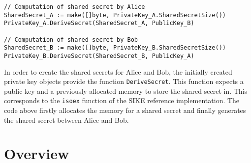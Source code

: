 \begin{lstlisting}[]
// Computation of shared secret by Alice
SharedSecret_A := make([]byte, PrivateKey_A.SharedSecretSize())
PrivateKey_A.DeriveSecret(SharedSecret_A, PublicKey_B)

// Computation of shared secret by Bob
SharedSecret_B := make([]byte, PrivateKey_B.SharedSecretSize())
PrivateKey_B.DeriveSecret(SharedSecret_B, PublicKey_A)
\end{lstlisting}
In order to create the shared secrets for Alice and Bob, the initially created private key objects provide the function \texttt{DeriveSecret}. This function expects a public key and a previously allocated memory to store the shared secret in. This corresponds to the \texttt{isoex} function of the SIKE reference implementation.
The code above firstly allocates the memory for a shared secret and finally generates the shared secret between Alice and Bob.

\section{Overview}

